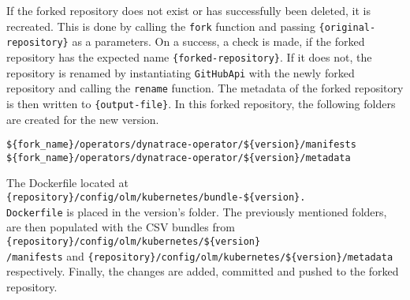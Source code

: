 If the forked repository does not exist or has successfully been deleted, it is recreated.
This is done by calling the \verb|fork| function and passing \verb|{original-repository}| as a parameters.
On a success, a check is made, if the forked repository has the expected name \verb|{forked-repository}|.
If it does not, the repository is renamed by instantiating \verb|GitHubApi| with the newly forked repository and calling the \verb|rename| function.
The metadata of the forked repository is then written to \verb|{output-file}|.
In this forked repository, the following folders are created for the new version.

\begin{verbatim}
${fork_name}/operators/dynatrace-operator/${version}/manifests
${fork_name}/operators/dynatrace-operator/${version}/metadata
\end{verbatim}

\pagebreak

The Dockerfile located at \verb|{repository}/config/olm/kubernetes/bundle-${version}.|\\\verb|Dockerfile| is placed in the version's folder.
The previously mentioned folders, are then populated with the CSV bundles from \verb|{repository}/config/olm/kubernetes/${version}|\\\verb|/manifests| and \verb|{repository}/config/olm/kubernetes/${version}/metadata| respectively.
Finally, the changes are added, committed and pushed to the forked repository.
